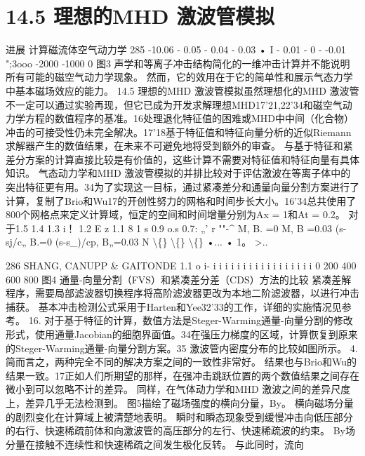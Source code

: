 \documentclass[UTF8,11pt,a4paper,openany,fontset=fandol]{ctexbook}
\begin{document}
\section{14.5 理想的MHD 激波管模拟}
进展 计算磁流体空气动力学 285 -10.06 - 0.05 - 0.04 - 0.03 • I - 0.01 - 0 - -0.01 ";3ooo -2000 -1000 0 图3 声学和等离子冲击结构简化的一维冲击计算并不能说明所有可能的磁空气动力学现象。 然而，它的效用在于它的简单性和展示气态力学中基本磁场效应的能力。 14.5 理想的MHD 激波管模拟虽然理想化的MHD 激波管不一定可以通过实验再现，但它已成为开发求解理想MHD17'21,22'34和磁空气动力学方程的数值程序的基准。16处理退化特征值的困难或MHD中中间（化合物）冲击的可接受性仍未完全解决。17'18基于特征值和特征向量分析的近似Riemann 求解器产生的数值结果，在未来不可避免地将受到额外的审查。 与基于特征和紧差分方案的计算直接比较是有价值的，这些计算不需要对特征值和特征向量有具体知识。 气态动力学和MHD 激波管模拟的并排比较对于评估激波在等离子体中的突出特征更有用。34为了实现这一目标，通过紧凑差分和通量向量分割方案进行了计算，复制了Brio和Wu17的开创性努力的网格和时间步长大小。16'34总共使用了800个网格点来定义计算域，恒定的空间和时间增量分别为Ax = 1和At = 0.2。 对于1.5 1.4 1.3 i！ 1.2 E z 1.1 8 1 s 0.9 o.s 0.7: „' r ""-\textasciicircum{} M, B. =0 M, B =0.03 (s-sj/c„ B.=0 (s-s\_)/cp, B„=0.03 N \textbackslash\{\} \textbackslash\{\} \textbackslash\{\} •... • 1。 >..

286 SHANG, CANUPP \& GAITONDE 1.1 o i- i i i i i i i i i i i i i i i i i 0 200 400 600 800 图4 通量-向量分割（FVS）和紧凑差分差（CDS）方法的比较 紧凑差解程序，需要局部滤波器切换程序将高阶滤波器更改为本地二阶滤波器，以进行冲击捕获。 基本冲击检测公式采用于Harten和Yee32'33的工作，详细的实施情况见参考。 16. 对于基于特征的计算，数值方法是Steger-Warming通量-向量分割的修改形式，使用通量Jacobian的细胞界面值。34在强压力梯度的区域，计算恢复到原来的Steger-Warming通量-向量分割方案。35 激波管内密度分布的比较如图所示。 4. 简而言之，两种完全不同的解决方案之间的一致性非常好。 结果也与Brio和Wu的结果一致。17正如人们所期望的那样，在强冲击跳跃位置的两个数值结果之间存在微小到可以忽略不计的差异。 同样，在气体动力学和MHD 激波之间的差异尺度上，差异几乎无法检测到。 图5描绘了磁场强度的横向分量，By。 横向磁场分量的剧烈变化在计算域上被清楚地表明。 瞬时和瞬态现象受到缓慢冲击向低压部分的右行、快速稀疏前体和向激波管的高压部分的左行、快速稀疏波的约束。 By场分量在接触不连续性和快速稀疏之间发生极化反转。 与此同时，流向
\end{document}
